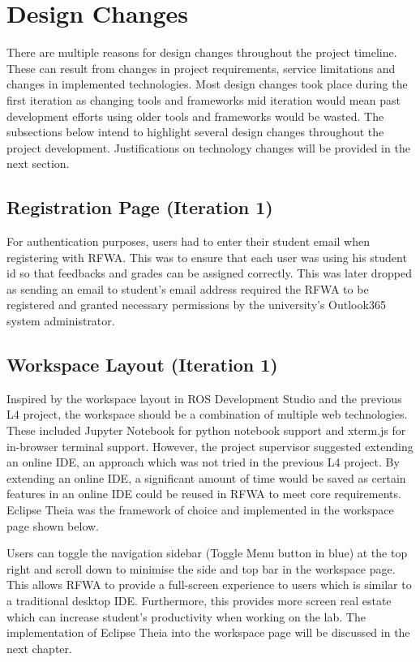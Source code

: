 \documentclass{l4proj}
\begin{document}
\section {Design Changes}

There are multiple reasons for design changes throughout the project timeline. These can result from changes in project requirements, service limitations and changes in implemented technologies. Most design changes took place during the first iteration as changing tools and frameworks mid iteration would mean past development efforts using older tools and frameworks would be wasted. The subsections below intend to highlight several design changes throughout the project development. Justifications on technology changes will be provided in the next section.

\subsection{Registration Page (Iteration 1)} 

For authentication purposes, users had to enter their student email when registering with RFWA. This was to ensure that each user was using his student id so that feedbacks and grades can be assigned correctly. This was later dropped as sending an email to student's email address required the RFWA to be registered and granted necessary permissions by the university's Outlook365 system administrator. 

\subsection{Workspace Layout (Iteration 1)}

Inspired by the workspace layout in ROS Development Studio and the previous L4 project, the workspace should be a combination of multiple web technologies. These included Jupyter Notebook for python notebook support and xterm.js for in-browser terminal support. However, the project supervisor suggested extending an online IDE, an approach which was not tried in the previous L4 project. By extending an online IDE, a significant amount of time would be saved as certain features in an online IDE could be reused in RFWA to meet core requirements. Eclipse Theia was the framework of choice and implemented in the workspace page shown below.

 Users can toggle the navigation sidebar (Toggle Menu button in blue) at the top right and scroll down to minimise the side and top bar in the workspace page. This allows RFWA to provide a full-screen experience to users which is similar to a traditional desktop IDE.  Furthermore, this provides more screen real estate which can increase student's productivity when working on the lab. The implementation of Eclipse Theia into the workspace page will be discussed in the next chapter.
 
\end{document}
